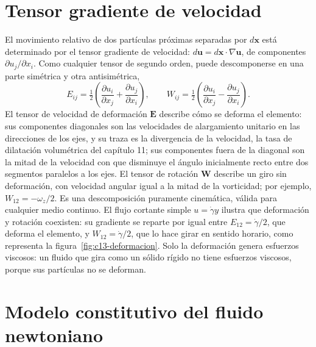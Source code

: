 \documentclass[10pt,openany]{book}
\begin{document}
\section{Tensor gradiente de velocidad}

El movimiento relativo de dos partículas próximas separadas por \(d\mathbf{x}\) está determinado por el tensor gradiente de velocidad: \(d\mathbf{u} = d\mathbf{x}\cdot\nabla\mathbf{u}\), de componentes \(\partial u_j/\partial x_i\). Como cualquier tensor de segundo orden, puede descomponerse en una parte simétrica y otra antisimétrica,
\begin{equation}
E_{ij} = \tfrac12\left(\frac{\partial u_i}{\partial x_j} + \frac{\partial u_j}{\partial x_i}\right), \qquad W_{ij} = \tfrac12\left(\frac{\partial u_i}{\partial x_j} - \frac{\partial u_j}{\partial x_i}\right). \label{eq:c13-EW}
\end{equation}
El tensor de velocidad de deformación \(\mathbf{E}\) describe cómo se deforma el elemento: sus componentes diagonales son las velocidades de alargamiento unitario en las direcciones de los ejes, y su traza es la divergencia de la velocidad, la tasa de dilatación volumétrica del capítulo 11; sus componentes fuera de la diagonal son la mitad de la velocidad con que disminuye el ángulo inicialmente recto entre dos segmentos paralelos a los ejes. El tensor de rotación \(\mathbf{W}\) describe un giro sin deformación, con velocidad angular igual a la mitad de la vorticidad; por ejemplo, \(W_{12} = -\omega_z/2\). Es una descomposición puramente cinemática, válida para cualquier medio continuo. El flujo cortante simple \(u = \dot\gamma y\) ilustra que deformación y rotación coexisten: su gradiente se reparte por igual entre \(E_{12} = \dot\gamma/2\), que deforma el elemento, y \(W_{12} = \dot\gamma/2\), que lo hace girar en sentido horario, como representa la figura~\ref{fig:c13-deformacion}. Solo la deformación genera esfuerzos viscosos: un fluido que gira como un sólido rígido no tiene esfuerzos viscosos, porque sus partículas no se deforman.

\section{Modelo constitutivo del fluido newtoniano}
\end{document}
